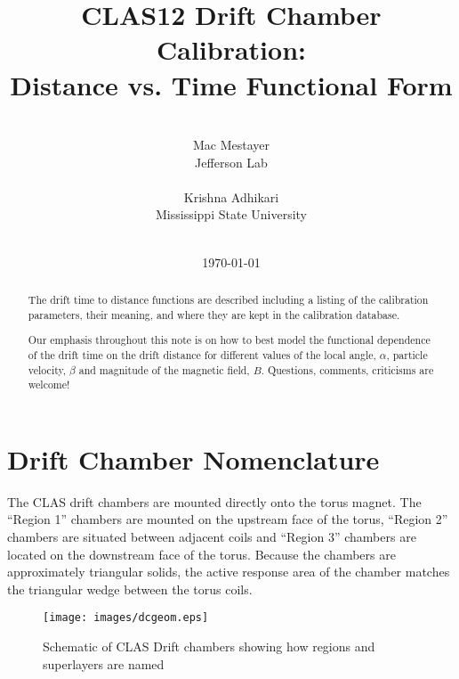 \documentclass{article}
\begin{document}
\title{CLAS12 Drift Chamber Calibration:\\
Distance vs. Time Functional Form}
\author{
\vspace{5cm}\\
Mac Mestayer\\
Jefferson Lab\\
\vspace{0.20cm}\\
Krishna Adhikari\\
Mississippi State University\\
\vspace{0.3cm}\\
}
\date{\today}
\maketitle


\begin{abstract}

The drift time to distance functions are described including a listing of
the calibration parameters, their meaning, and where they are
kept in the calibration database.  

Our emphasis throughout this note is on how to best model
the functional dependence of the drift time on the drift
distance for different values of the local angle, $\alpha$,
particle velocity, $\beta$ and magnitude of the magnetic field,
$B$. Questions, comments, criticisms are welcome!

\end{abstract}
\pagebreak

\tableofcontents




\section{Drift Chamber Nomenclature}
\label{sec:nomenclature}
The CLAS drift chambers are mounted directly onto the torus magnet. 
The ``Region 1'' chambers are mounted on the upstream face of the
torus, ``Region 2'' chambers are situated between adjacent coils and
``Region 3'' chambers are located on the downstream face of the torus.
Because the chambers are approximately triangular solids, the active
response area of the chamber matches the triangular wedge between the
torus coils.

\begin{figure}[hbt]
\centering
\texttt{[image: images/dcgeom.eps]}
\caption{Schematic of CLAS Drift chambers showing how regions and 
superlayers are named}
\label{fig:dcgeom}
\end{figure}
\end{document}
